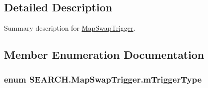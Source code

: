 \subsection{Detailed Description}
Summary description for \hyperlink{class_s_e_a_r_c_h_1_1_map_swap_trigger}{Map\-Swap\-Trigger}. 



\subsection{Member Enumeration Documentation}
\hypertarget{class_s_e_a_r_c_h_1_1_map_swap_trigger_a293d493ac648d62dd39a2be6a8f7ff57}{
\subsubsection[{m\-Trigger\-Type}]{\setlength{\rightskip}{0pt plus 5cm}enum {\bf S\-E\-A\-R\-C\-H.\-Map\-Swap\-Trigger.\-m\-Trigger\-Type}}}\label{class_s_e_a_r_c_h_1_1_map_swap_trigger_a293d493ac648d62dd39a2be6a8f7ff57}
